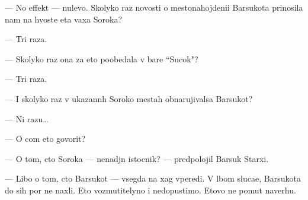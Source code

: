 \documentclass[12pt]{book}
\begin{document}
— No effekt — nulevo{\y}. Skolyko raz novosti o mestonahojdeni{\y}i Barsukota prinosila nam na hvoste eta vaxa Soroka?

— Tri raza.

— Skolyko raz ona za eto poobedala v bare ``Sucok"?

— Tri raza.

— I skoly\-ko raz v ukazann{\yi}h Soroko{\y} mestah obnarujivalsa Barsukot?

— Ni razu…

— O com eto govorit?

— O tom, cto Soroka — nenad{\e}jn{\yi}{\y} istocnik? — predpolojil Barsuk Starxi{\y}.

— Libo o tom, cto Barsukot — vsegda na xag vperedi. V l{\io}bom sluca{\y}e, Barsukota do sih por ne naxli. Eto vozmutitelyno i nedopustimo. Etovo ne po{\y}mut naverhu. 
\end{document}
